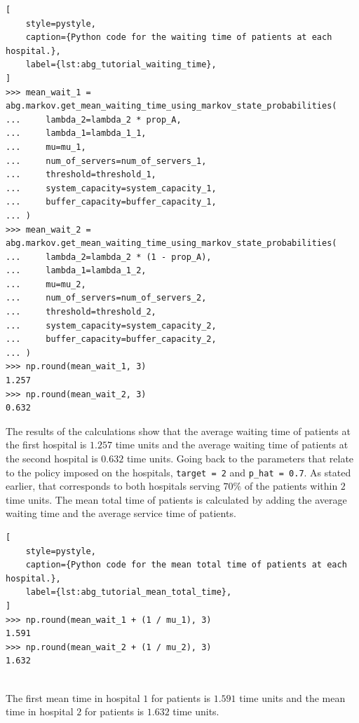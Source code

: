 \begin{lstlisting}[
    style=pystyle,
    caption={Python code for the waiting time of patients at each hospital.},
    label={lst:abg_tutorial_waiting_time},
]
>>> mean_wait_1 = abg.markov.get_mean_waiting_time_using_markov_state_probabilities(
...     lambda_2=lambda_2 * prop_A,
...     lambda_1=lambda_1_1,
...     mu=mu_1,
...     num_of_servers=num_of_servers_1,
...     threshold=threshold_1,
...     system_capacity=system_capacity_1,
...     buffer_capacity=buffer_capacity_1,
... )
>>> mean_wait_2 = abg.markov.get_mean_waiting_time_using_markov_state_probabilities(
...     lambda_2=lambda_2 * (1 - prop_A),
...     lambda_1=lambda_1_2,
...     mu=mu_2,
...     num_of_servers=num_of_servers_2,
...     threshold=threshold_2,
...     system_capacity=system_capacity_2,
...     buffer_capacity=buffer_capacity_2,
... )
>>> np.round(mean_wait_1, 3)
1.257
>>> np.round(mean_wait_2, 3)
0.632

\end{lstlisting}

The results of the calculations show that the average waiting time of patients
at the first hospital is \(1.257\) time units and the average waiting time of
patients at the second hospital is \(0.632\) time units.
Going back to the parameters that relate to the policy imposed on the hospitals,
\texttt{target = 2} and \texttt{p\_hat = 0.7}.
As stated earlier, that corresponds to both hospitals serving \(70\%\) of the
patients within \(2\) time units.
The mean total time of patients is calculated by adding the average waiting
time and the average service time of patients.

\begin{lstlisting}[
    style=pystyle,
    caption={Python code for the mean total time of patients at each hospital.},
    label={lst:abg_tutorial_mean_total_time},
]
>>> np.round(mean_wait_1 + (1 / mu_1), 3)
1.591
>>> np.round(mean_wait_2 + (1 / mu_2), 3)
1.632
    
\end{lstlisting}

The first mean time in hospital \(1\) for patients is \(1.591\) time units and
the mean time in hospital \(2\) for patients is \(1.632\) time units.
